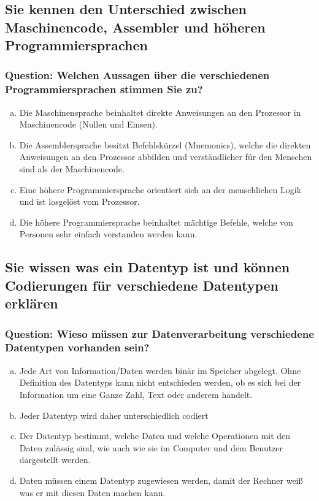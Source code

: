 \documentclass{article}
\begin{document}
\begin{adjustwidth}{2em}{2em}
\begin{adjustwidth}{2em}{2em}
			\subsection{Sie kennen den Unterschied zwischen Maschinencode, Assembler und höheren Programmiersprachen}
			\begin{adjustwidth}{1em}{}
				\subsubsection*{Question: Welchen Aussagen über die verschiedenen Programmiersprachen stimmen Sie zu?}
				\begin{adjustwidth}{1em}{}
					\begin{enumerate}[(a)]
						\item Die Maschinensprache beinhaltet direkte Anweisungen an den Prozessor in Maschinencode (Nullen und Einsen).
						\item Die Assemblersprache besitzt Befehlskürzel (Mnemonics), welche die direkten Anweisungen an den Prozessor abbilden und verständlicher für den Menschen sind als der Maschinencode.
						\item Eine höhere Programmiersprache orientiert sich an der menschlichen Logik und ist losgelöst vom Prozessor.
						\item Die höhere Programmiersprache beinhaltet mächtige Befehle, welche von Personen sehr einfach verstanden werden kann.
					\end{enumerate}
				\end{adjustwidth}
			\end{adjustwidth}
			\subsection{Sie wissen was ein Datentyp ist und können Codierungen für verschiedene Datentypen erklären}
			\begin{adjustwidth}{1em}{}
				\subsubsection*{Question: Wieso müssen zur Datenverarbeitung verschiedene Datentypen vorhanden sein?}
				\begin{adjustwidth}{1em}{}
					\begin{enumerate}[(a)]
						\item Jede Art von Information/Daten werden binär im Speicher abgelegt. Ohne Definition des Datentyps kann nicht entschieden werden, ob es sich bei der Information um eine Ganze Zahl, Text oder anderem handelt.
						\item Jeder Datentyp wird daher unterschiedlich codiert
						\item Der Datentyp bestimmt, welche Daten und welche Operationen mit den Daten zulässig sind, wie auch wie sie im Computer und dem Benutzer dargestellt werden.
						\item Daten müssen einem Datentyp zugewiesen werden, damit der Rechner weiß was er mit diesen Daten machen kann.
					\end{enumerate}
				\end{adjustwidth}
			\end{adjustwidth}

\end{adjustwidth}
\end{adjustwidth}
\end{document}
